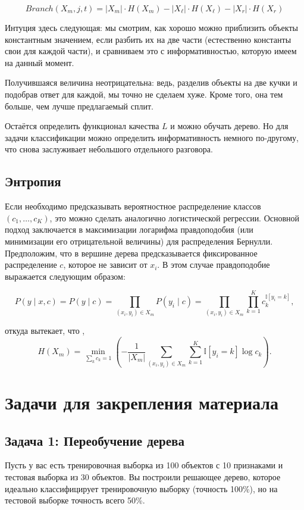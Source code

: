 \[
    Branch(X_m, j, t) = |X_m| \cdot H(X_m) - |X_\ell| \cdot H(X_\ell) - |X_r| \cdot H(X_r)
\]

Интуция здесь следующая: мы смотрим, как хорошо можно приблизить объекты константным значением, если разбить их на две части (естественно константы свои для каждой части), и сравниваем это с информативностью, которую имеем на данный момент.

Получившаяся величина неотрицательна: ведь, разделив объекты на две кучки и подобрав ответ для каждой, мы точно не сделаем хуже. Кроме того, она тем больше, чем лучше предлагаемый сплит.

Остаётся определить функционал качества $L$ и можно обучать дерево. Но для задачи классификации можно определить информативность немного по-другому, что снова заслуживает небольшого отдельного разговора.

\subsection{Энтропия}
Если необходимо предсказывать вероятностное распределение классов $(c_1, \dots, c_K)$, это можно сделать аналогично логистической регрессии. Основной подход заключается в максимизации логарифма правдоподобия (или минимизации его отрицательной величины) для распределения Бернулли. Предположим, что в вершине дерева предсказывается фиксированное распределение $c$, которое не зависит от $x_i$. В этом случае правдоподобие выражается следующим образом:

\[
    P(y \mid x, c) = P(y \mid c) = \prod_{(x_i, y_i) \in X_m} P(y_i \mid c) = \prod_{(x_i, y_i) \in X_m} \prod_{k=1}^K c_k^{\mathbb{I}[y_i = k]},
\]

откуда вытекает, что
,
\[
    H(X_m) = \min_{\sum_k c_k = 1} \left( -\frac{1}{|X_m|} \sum_{(x_i, y_i) \in X_m} \sum_{k=1}^K \mathbb{I}[y_i = k] \log c_k \right).
\]

\section{Задачи для закрепления материала}
\subsection{Задача 1: Переобучение дерева}
Пусть у вас есть тренировочная выборка из 100 объектов с 10 признаками и тестовая выборка из 30 объектов. Вы построили решающее дерево, которое идеально классифицирует тренировочную выборку (точность 100\%), но на тестовой выборке точность всего 50\%.

